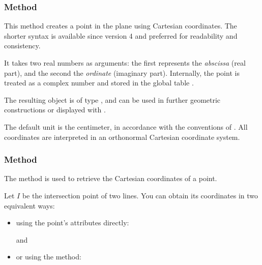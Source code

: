 \subsubsection{Method } %
\label{ssub:method_point_new}

This method creates a point in the plane using Cartesian coordinates. The shorter syntax  is available since version 4 and preferred for readability and consistency.

\medskip
\noindent
It takes two real numbers as arguments: the first represents the \emph{abscissa} (real part), and the second the \emph{ordinate} (imaginary part). Internally, the point is treated as a complex number and stored in the global table .

\medskip
\noindent
The resulting object is of type , and can be used in further geometric constructions or displayed with .

\medskip
\noindent
{} The default unit is the centimeter, in accordance with the conventions of . All coordinates are interpreted in an orthonormal Cartesian coordinate system.

\vspace{1em}

\begin{tkzexample}[latex = 7cm]
\end{tkzexample}

\subsubsection{Method } %
\label{ssub:method_point_get}

The  method is used to retrieve the Cartesian coordinates of a point.

\medskip
\noindent
Let $I$ be the intersection point of two lines. You can obtain its coordinates in two equivalent ways:
\begin{itemize}
  \item using the point’s attributes directly:
    \begin{center}
     \quad and \quad {}
    \end{center}
  \item or using the  method:
    \begin{center}
    \end{center}
\end{itemize}

